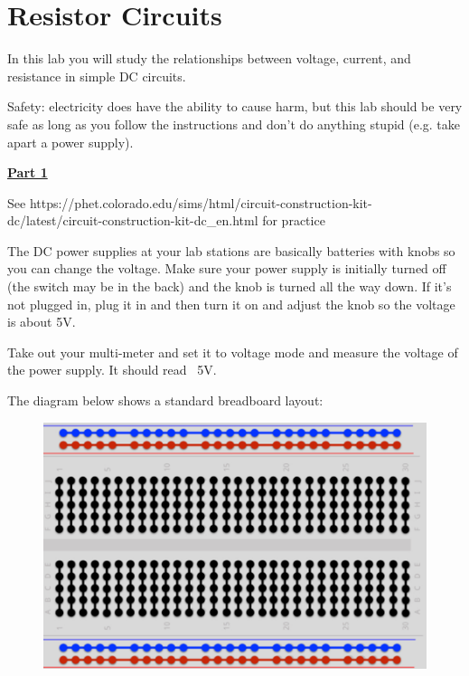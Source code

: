 \section{Resistor Circuits}

In this lab you will study the relationships between voltage, current, and resistance in simple DC circuits.

\vspace{\baselineskip}

Safety: electricity does have the ability to cause harm, but this lab should be very safe as long as you follow the instructions and don’t do anything stupid (e.g. take apart a power supply). 

\vspace{\baselineskip}

\underline{\textbf{Part 1}} \par
See https://phet.colorado.edu/sims/html/circuit-construction-kit-dc/latest/circuit-construction-kit-dc\_en.html for practice

\vspace{\baselineskip}

The DC power supplies at your lab stations are basically batteries with knobs so you can change the voltage.
Make sure your power supply is initially turned off (the switch may be in the back) and the knob is turned all the way down.
If it's not plugged in, plug it in and then turn it on and adjust the knob so the voltage is about 5V. 

\vspace{\baselineskip}

Take out your multi-meter and set it to voltage mode and measure the voltage of the power supply. It should read ~5V.

\vspace{\baselineskip}

The diagram below shows a standard breadboard layout:

\begin{figure}[H]
\includegraphics[scale=0.80]{figures/resistor-circuits/breadboard.png}
\end{figure}

